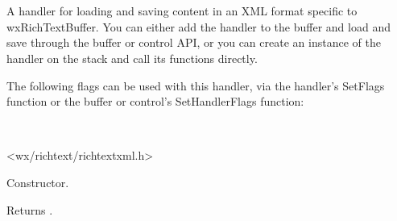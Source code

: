 \section{}\label{wxrichtextxmlhandler}

A handler for loading and saving content in an XML format specific
to wxRichTextBuffer. You can either add the handler to the buffer
and load and save through the buffer or control API, or you can
create an instance of the handler on the stack and call its
functions directly.


The following flags can be used with this handler, via
the handler's SetFlags function or the buffer or control's
SetHandlerFlags function:

\twocolwidtha{7cm}
\begin{twocollist}\itemsep=0pt
\end{twocollist}


\\


<wx/richtext/richtextxml.h>





\label{wxrichtextxmlhandlerwxrichtextxmlhandler}


Constructor.

\label{wxrichtextxmlhandlercanload}


Returns \true.

\label{wxrichtextxmlhandlercansave}


